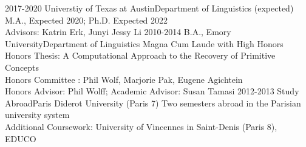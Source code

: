 %
%
%



\begin{education}
  \school
    {2017-2020}   {}{Universtiy of Texas at Austin}{Department of Linguistics}
    {(expected)} {
                      M.A., Expected 2020; Ph.D. Expected 2022\\
                      Advisors: Katrin Erk, Junyi Jessy Li
                    }
  \emptySeparator
  \school
    {2010-2014}   {B.A., }{Emory University}{Department of Linguistics}
    {} {            
                      Magna Cum Laude with High Honors\\
                      Honors Thesis: A Computational Approach to the Recovery of Primitive Concepts\\
                      Honors Committee : Phil Wolf, Marjorie Pak, Eugene Agichtein \\
                      Honors Advisor: Phil Wolff; Academic Advisor: Susan Tamasi
                    }
  \emptySeparator
   \school
    {2012-2013}   {}{Study Abroad}{Paris Diderot University (Paris 7)}
    {} {            
                     Two semesters abroad in the Parisian university system\\
                     Additional Coursework: 
                    University of Vincennes in Saint-Denis (Paris 8), 
                    EDUCO
                    }
  \emptySeparator
\end{education}
